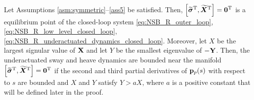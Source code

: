 \begin{theorem} \label{thm_NSB_R}
    Let Assumptions \ref{asm:symmetric}--\ref{ass5} be satisfied.
    Then, $\Bigl[\widetilde{\bm{\sigma}}^{\mathrm{T}}, \widetilde{\bm{X}}^{\mathrm{T}}\Bigr] = \mathbf{0}^{\mathrm{T}}$ is a  equilibrium point of the closed-loop system \eqref{eq:NSB_R_outer_loop}, \eqref{eq:NSB_R_low_level_closed_loop}, \eqref{eq:NSB_R_underactuated_dynamics_closed_loop}.
    Moreover, let $X$ be the largest signular value of $\mathbf{X}$ and let $Y$ be the smallest eigenvalue of $-\mathbf{Y}$.
    Then, the underactuated sway and heave dynamics are bounded near the manifold $\Bigl[\widetilde{\bm{\sigma}}^{\mathrm{T}}, \widetilde{\bm{X}}^{\mathrm{T}}\Bigr] = \mathbf{0}^{\mathrm{T}}$ if the second and third partial derivatives of $\mathbf{p}_p(s)$ with respect to $s$ are bounded and $X$ and $Y$ satisfy $Y > aX$, where $a$ is a positive constant that will be defined later in the proof.
\end{theorem}

